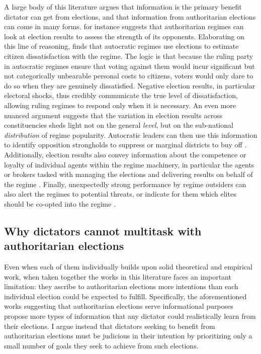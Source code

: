 \documentclass[12pt]{article}
\newcommand{\1}{\mathbbm{1}}
\begin{document}
A large body of this literature argues that information is the primary benefit dictator can get from elections, and that information from authoritarian elections can come in many forms. \cite{Geddes2005} for instance suggests that authoritarian regimes can look at election results to assess the strength of its opponents. Elaborating on this line of reasoning, \cite{Miller2015} finds that autocratic regimes use elections to estimate citizen dissatisfaction with the regime. The logic is that because the ruling party in autocratic regimes ensure that voting against them would incur significant but not categorically unbearable personal costs to citizens, voters would only dare to do so when they are genuinely dissatisfied. Negative election results, in particular electoral shocks, thus credibly communicate the true level of dissatisfaction, allowing ruling regimes to respond only when it is necessary. An even more nuanced argument suggests that the variation in election results across constituencies sheds light not on the general \textit{level}, but on the sub-national \textit{distribution} of regime popularity. Autocratic leaders can then use this information to identify opposition strongholds to suppress \citep{Magaloni2006, Blaydes2008} or marginal districts to buy off \citep{Reed2001, Magaloni2006}. Additionally, election results also convey information about the competence or loyalty of individual agents within the regime machinery, in particular the agents or brokers tasked with managing the elections and delivering results on behalf of the regime \citep{Magaloni2006, Blaydes2008, Myagkov2009, RundlettSvolik2016}. Finally, unexpectedly strong performance by regime outsiders can also alert the regimes to potential threats, or indicate for them which elites should be co-opted into the regime \cite{LustOkar2005}.

\subsection{Why dictators cannot multitask with authoritarian elections}
\label{sec:theory_priority}

Even when each of them individually builds upon solid theoretical and empirical work, when taken together the works in this literature faces an important limitation: they ascribe to authoritarian elections more intentions than each individual election could be expected to fulfill. Specifically, the aforementioned works suggesting that authoritarian elections serve informational purposes propose more types of information that any dictator could realistically learn from their elections. I argue instead that dictators seeking to benefit from authoritarian elections must be judicious in their intention by prioritizing only a small number of goals they seek to achieve from such elections. 
\end{document}
